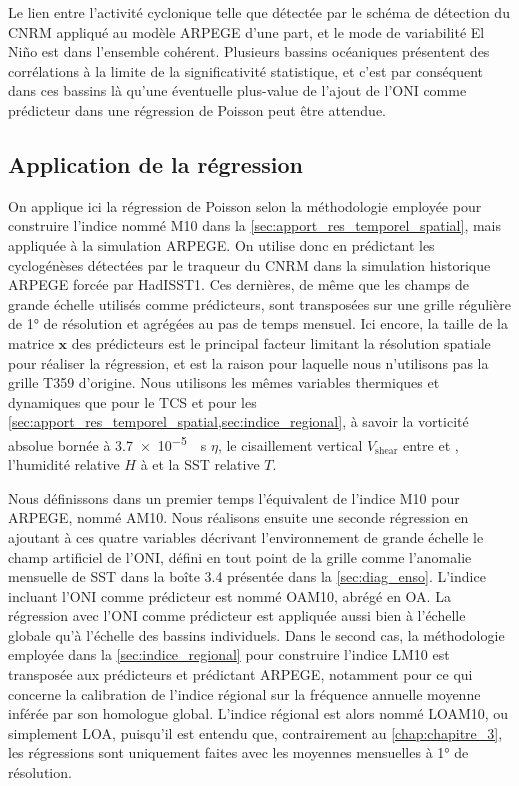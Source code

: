 \documentclass[../main.tex]{subfiles}
\begin{document}
Le lien entre l'activité cyclonique telle que détectée par le schéma de détection du CNRM appliqué au modèle ARPEGE d'une part, et le mode de variabilité El
Niño est dans l'ensemble cohérent. Plusieurs bassins océaniques présentent des corrélations à la limite de la significativité statistique, et c'est par
conséquent dans ces bassins là qu'une éventuelle plus-value de l'ajout de l'ONI comme prédicteur dans une régression de Poisson peut être attendue.

\subsection{Application de la régression}

On applique ici la régression de Poisson selon la méthodologie employée pour construire l'indice nommé M10 dans la \cref{sec:apport_res_temporel_spatial}, mais
appliquée à la simulation ARPEGE. On utilise donc en prédictant les cyclogénèses détectées par le traqueur du CNRM dans la simulation historique ARPEGE forcée
par HadISST1. Ces dernières, de même que les champs de grande échelle utilisés comme prédicteurs, sont transposées sur une grille régulière de \ang{1} de
résolution et agrégées au pas de temps mensuel. Ici encore, la taille de la matrice $\mathbf{x}$ des prédicteurs est le principal facteur limitant la résolution
spatiale pour réaliser la régression, et est la raison pour laquelle nous n'utilisons pas la grille T359 d'origine. Nous utilisons les mêmes variables
thermiques et dynamiques que pour le TCS et pour les \cref{sec:apport_res_temporel_spatial,sec:indice_regional}, à savoir la vorticité absolue bornée à
\SI{3.7e-5}{\per\second} $\eta$, le cisaillement vertical $V_{\mathrm{shear}}$ entre  et , l'humidité relative $H$ à  et la SST
relative $T$.

Nous définissons dans un premier temps l'équivalent de l'indice M10 pour ARPEGE, nommé AM10. Nous réalisons ensuite une seconde régression en ajoutant à
ces quatre variables décrivant l'environnement de grande échelle le champ artificiel de l'ONI, défini en tout point de la grille comme l'anomalie
mensuelle de SST dans la boîte 3.4 présentée dans la \cref{sec:diag_enso}. L'indice incluant l'ONI comme prédicteur est nommé OAM10, abrégé en OA. La régression
avec l'ONI comme prédicteur est appliquée aussi bien à l'échelle globale qu'à l'échelle des bassins individuels. Dans le second cas, la méthodologie employée
dans la \cref{sec:indice_regional} pour construire l'indice LM10 est transposée aux prédicteurs et prédictant ARPEGE, notamment pour ce qui concerne la
calibration de l'indice régional sur la fréquence annuelle moyenne inférée par son homologue global. L'indice régional est alors nommé LOAM10, ou simplement
LOA, puisqu'il est entendu que, contrairement au \cref{chap:chapitre_3}, les régressions sont uniquement faites avec les moyennes mensuelles à \ang{1} de
résolution.
\end{document}
